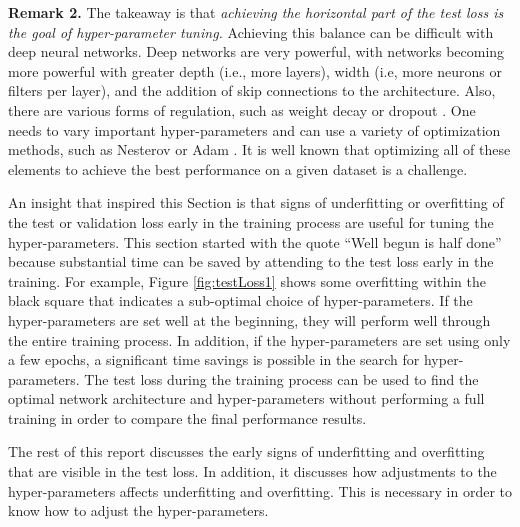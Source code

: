 \documentclass{article} %
\begin{document}
\textbf{Remark 2.} The takeaway is that \emph{achieving the horizontal part of the test loss is the goal of hyper-parameter tuning.}
Achieving this balance can be difficult with deep neural networks.   Deep networks are very powerful, with networks becoming more powerful with greater depth (i.e., more layers), width (i.e, more neurons or filters per layer), and the addition of  skip connections to the architecture.   Also, there are various forms of regulation, such as weight decay or dropout \citep{srivastava2014dropout}.  One needs to vary important hyper-parameters and can use a variety of optimization methods, such as Nesterov or Adam \citep{kingma2014adam}.  It is well known that optimizing all of these elements to achieve the best performance on a given dataset is a challenge.  







An insight that inspired this Section is that signs of underfitting or overfitting of the test or validation loss early in the training process are useful for tuning the hyper-parameters.  This section started with the quote ``Well begun is half done'' because substantial time can be saved by attending to the test loss early in the training.  For example, Figure \ref{fig:testLoss1} shows some overfitting within the black square that indicates a sub-optimal choice of hyper-parameters.  If the hyper-parameters are set well at the beginning, they will perform well through the entire training process.   In addition, if the hyper-parameters are set using only a few epochs, a significant time savings is possible in the search for hyper-parameters.  The test loss during the training process can be used to find the optimal network architecture and hyper-parameters without performing a full training in order to compare the final performance results.

The rest of this report discusses the early signs of underfitting and overfitting that are visible in the test loss.  In addition, it discusses how adjustments to the hyper-parameters affects underfitting and overfitting.  This is necessary in order to know how to adjust the hyper-parameters.  
\end{document}
